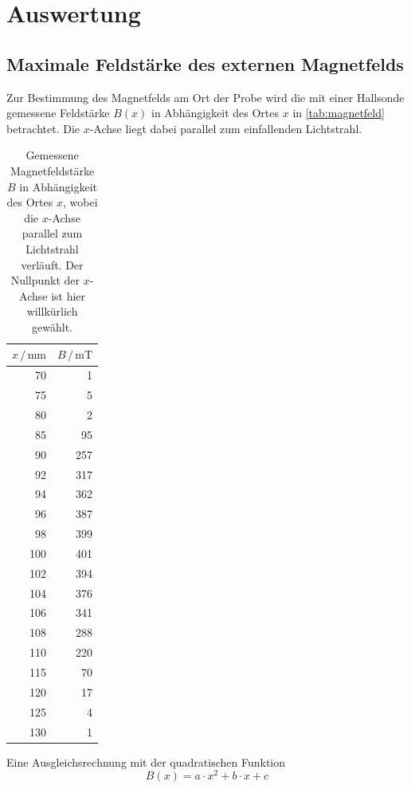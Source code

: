 \section{Auswertung}
\label{sec:Auswertung}

\subsection{Maximale Feldstärke des externen Magnetfelds}
\label{sec:magnetfeld}
Zur Bestimmung des Magnetfelds am Ort der Probe wird die mit einer Hallsonde gemessene Feldstärke $B(x)$ in Abhängigkeit des Ortes $x$ in \autoref{tab:magnetfeld} betrachtet.
Die $x$-Achse liegt dabei parallel zum einfallenden Lichtstrahl.
\begin{table}
    \centering
    \caption{Gemessene Magnetfeldstärke $B$ in Abhängigkeit des Ortes $x$, wobei die $x$-Achse parallel zum Lichtstrahl verläuft.
    Der Nullpunkt der $x$-Achse ist hier willkürlich gewählt.
    }
    \label{tab:magnetfeld}
    \begin{tabular}{r r}
        \toprule
        $x \,/\, \unit{\milli\metre}$ & $B \,/\, \unit{\milli\tesla}$\\
        \midrule
        70 & 1 \\
        75 & 5 \\
        80 & 2 \\
        85 & 95 \\
        90 & 257 \\
        92 & 317 \\
        94 & 362 \\
        96 & 387 \\
        98 & 399 \\
        100 & 401 \\
        102 & 394 \\
        104 & 376 \\
        106 & 341 \\
        108 & 288 \\
        110 & 220 \\
        115 & 70 \\
        120 & 17 \\
        125 & 4 \\
        130 & 1 \\
        \bottomrule
    \end{tabular}
\end{table}
Eine Ausgleichsrechnung mit der quadratischen Funktion
\begin{equation}
    B(x) = a \cdot x^2 + b \cdot x + c
\end{equation}
